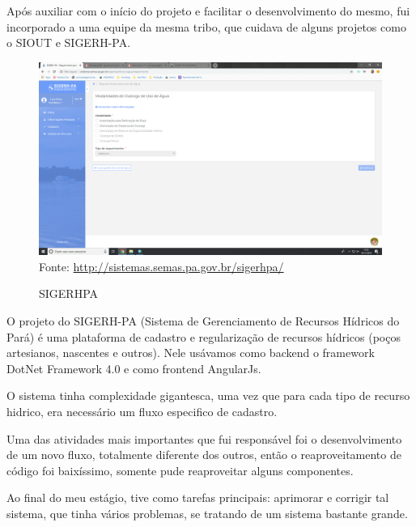 Após auxiliar com o início do projeto e facilitar o desenvolvimento do mesmo, fui incorporado a uma equipe da mesma tribo, que cuidava de alguns projetos como o SIOUT e SIGERH-PA.

\begin{figure}[H]
\centering
\caption{SIGERHPA} %
\includegraphics[scale=0.222]{sigerpa}\\  %
{\small Fonte: \url{http://sistemas.semas.pa.gov.br/sigerhpa/}} %
\label{fig:exemplo} %
\end{figure}

O projeto do SIGERH-PA (Sistema de Gerenciamento de Recursos Hídricos do Pará) é uma plataforma de cadastro e regularização de recursos hídricos (poços artesianos, nascentes e outros).
Nele usávamos como backend o framework DotNet Framework 4.0 e como frontend AngularJs.

O sistema tinha complexidade gigantesca, uma vez que para cada tipo de recurso hidrico, era necessário um fluxo especifico de cadastro.

Uma das atividades mais importantes que fui responsável foi o desenvolvimento de um novo fluxo, totalmente diferente dos outros, então o reaproveitamento de código foi baixíssimo, somente pude reaproveitar alguns componentes.

Ao final do meu estágio, tive como tarefas principais: aprimorar e corrigir tal sistema, que tinha
vários problemas, se tratando de um sistema bastante grande.